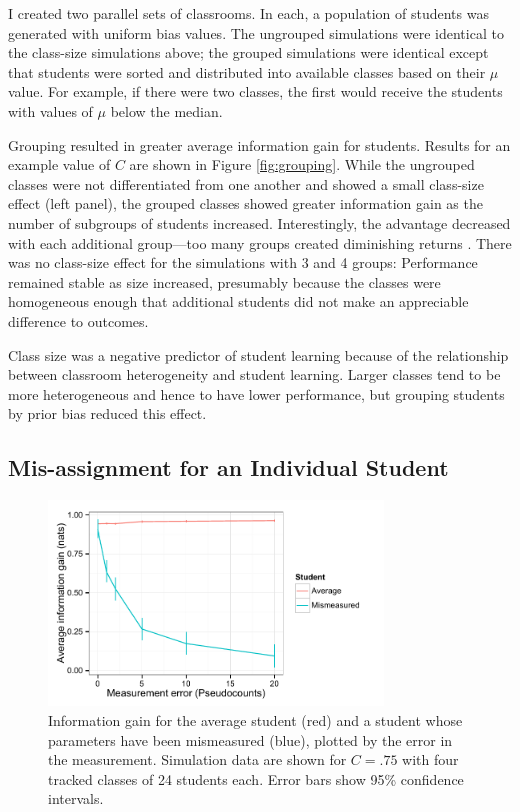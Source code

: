 \documentclass[10pt,letterpaper]{article}
\begin{document}
I created two parallel sets of classrooms. In each, a population of students was generated with uniform bias values. The ungrouped simulations were identical to the class-size simulations above; the grouped simulations were identical except that students were sorted and distributed into available classes based on their $\mu$ value. For example, if there were two classes, the first would receive the students with values of $\mu$ below the median. 

Grouping resulted in greater average information gain for students. Results for an example value of $C$ are shown in Figure \ref{fig:grouping}. While the ungrouped classes were not differentiated from one another and showed a small class-size effect (left panel), the grouped classes showed greater information gain as the number of subgroups of students increased. Interestingly, the advantage decreased with each additional group---too many groups created diminishing returns \cite{tomlinson1999}. There was no class-size effect for the simulations with 3 and 4 groups: Performance remained stable as size increased, presumably because the classes were homogeneous enough that additional students did not make an appreciable difference to outcomes.  

Class size was a negative predictor of student learning because of the relationship between classroom heterogeneity and student learning. Larger classes tend to be more heterogeneous and hence to have lower performance, but grouping students by prior bias reduced this effect.

\subsection{Mis-assignment for an Individual Student}

\begin{figure}
\begin{center}
\includegraphics[width=3.5in]{figures/mismeasured.pdf}
\end{center}
\caption{\label{fig:mismeasure} Information gain for the average student (red) and a student whose parameters have been mismeasured (blue), plotted by the error in the measurement. Simulation data are shown for $C=.75$ with four tracked classes of 24 students each. Error bars show 95\% confidence intervals.}
\end{figure}
\end{document}
